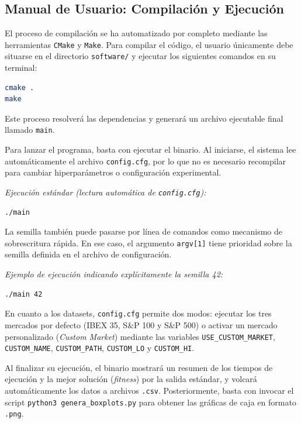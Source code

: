 \subsection{Manual de Usuario: Compilación y Ejecución}
El proceso de compilación se ha automatizado por completo mediante las herramientas \texttt{CMake} y \texttt{Make}. Para compilar el código, el usuario únicamente debe situarse en el directorio \texttt{software/} y ejecutar los siguientes comandos en su terminal:

\begin{lstlisting}[language=bash, frame=single]
cmake .
make
\end{lstlisting}

Este proceso resolverá las dependencias y generará un archivo ejecutable final llamado \texttt{main}. 

Para lanzar el programa, basta con ejecutar el binario. Al iniciarse, el sistema lee automáticamente el archivo \texttt{config.cfg}, por lo que no es necesario recompilar para cambiar hiperparámetros o configuración experimental.

\textit{Ejecución estándar (lectura automática de \texttt{config.cfg}):}
\begin{lstlisting}[language=bash, frame=single]
./main
\end{lstlisting}

La semilla también puede pasarse por línea de comandos como mecanismo de sobrescritura rápida. En ese caso, el argumento \texttt{argv[1]} tiene prioridad sobre la semilla definida en el archivo de configuración.

\textit{Ejemplo de ejecución indicando explícitamente la semilla 42:}
\begin{lstlisting}[language=bash, frame=single]
./main 42
\end{lstlisting}

En cuanto a los datasets, \texttt{config.cfg} permite dos modos: ejecutar los tres mercados por defecto (IBEX 35, S\&P 100 y S\&P 500) o activar un mercado personalizado (\textit{Custom Market}) mediante las variables \texttt{USE\_CUSTOM\_MARKET}, \texttt{CUSTOM\_NAME}, \texttt{CUSTOM\_PATH}, \texttt{CUSTOM\_LO} y \texttt{CUSTOM\_HI}. 

Al finalizar su ejecución, el binario mostrará un resumen de los tiempos de ejecución y la mejor solución (\textit{fitness}) por la salida estándar, y volcará automáticamente los datos a archivos \texttt{.csv}. Posteriormente, basta con invocar el script \texttt{python3 genera\_boxplots.py} para obtener las gráficas de caja en formato \texttt{.png}.